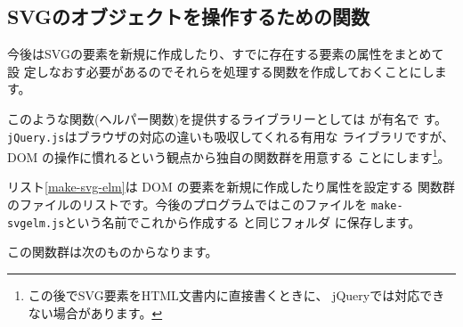 \subsection{SVGのオブジェクトを操作するための関数}
\iffalse
錯視の図形は数学的に規則正しい図形が多くあります。
SVG文書の開始時の\Event{onload}の処理関数で要素を追加すれば
今まで、手でSVGの個々の要素を指定していた図形がより簡単に描けます。
\fi

今後はSVGの要素を新規に作成したり、すでに存在する要素の属性をまとめて設
定しなおす必要があるのでそれらを処理する関数を作成しておくことにします。

このような関数(ヘルパー関数)を提供するライブラリーとしては
が有名で
す。\texttt{jQuery.js}はブラウザの対応の違いも吸収してくれる有用な
ライブラリですが、DOM の操作に慣れるという観点から独自の関数群を用意する
ことにします\footnote{この後でSVG要素をHTML文書内に直接書くときに、
jQueryでは対応できない場合があります。}。

リスト\ref{make-svg-elm}は DOM の要素を新規に作成したり属性を設定する
関数群のファイルのリストです。今後のプログラムではこのファイルを
\texttt{make-svgelm.js}という名前でこれから作成する \SVG と同じフォルダ
に保存します。

この関数群は次のものからなります。


